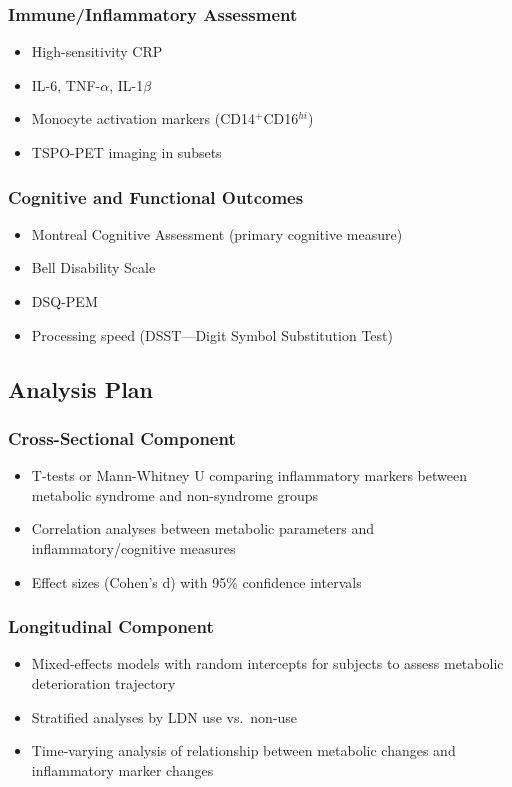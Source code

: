 \subsubsection{Immune/Inflammatory Assessment}
\begin{itemize}
    \item High-sensitivity CRP
    \item IL-6, TNF-$\alpha$, IL-1$\beta$
    \item Monocyte activation markers (CD14$^+$CD16$^{hi}$)
    \item TSPO-PET imaging in subsets
\end{itemize}

\subsubsection{Cognitive and Functional Outcomes}
\begin{itemize}
    \item Montreal Cognitive Assessment (primary cognitive measure)
    \item Bell Disability Scale
    \item DSQ-PEM
    \item Processing speed (DSST---Digit Symbol Substitution Test)
\end{itemize}

\subsection{Analysis Plan}

\subsubsection{Cross-Sectional Component}
\begin{itemize}
    \item T-tests or Mann-Whitney U comparing inflammatory markers between metabolic syndrome and non-syndrome groups
    \item Correlation analyses between metabolic parameters and inflammatory/cognitive measures
    \item Effect sizes (Cohen's d) with 95\% confidence intervals
\end{itemize}

\subsubsection{Longitudinal Component}
\begin{itemize}
    \item Mixed-effects models with random intercepts for subjects to assess metabolic deterioration trajectory
    \item Stratified analyses by LDN use vs.\ non-use
    \item Time-varying analysis of relationship between metabolic changes and inflammatory marker changes
\end{itemize}

